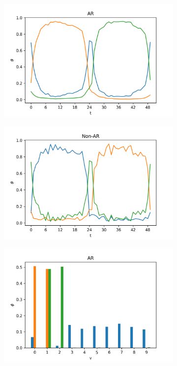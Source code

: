 \documentclass{mpaper}
\begin{document}
\begin{figure}
  \centering
  \begin{subfigure}[b]{0.48\textwidth}
    \includegraphics[width=\linewidth]{theta-ar_11.png}
  \end{subfigure}%

  \begin{subfigure}[b]{0.48\textwidth}
    \includegraphics[width=\linewidth]{theta-nonar_11.png}
  \end{subfigure}%
  \caption{The comparison of the $\theta$ values.}
  \label{fig:comp_theta}

  \begin{subfigure}[b]{0.48\textwidth}
    \includegraphics[width=\linewidth]{phi-ar_11.png}
  \end{subfigure}%


\end{figure}
\end{document}
